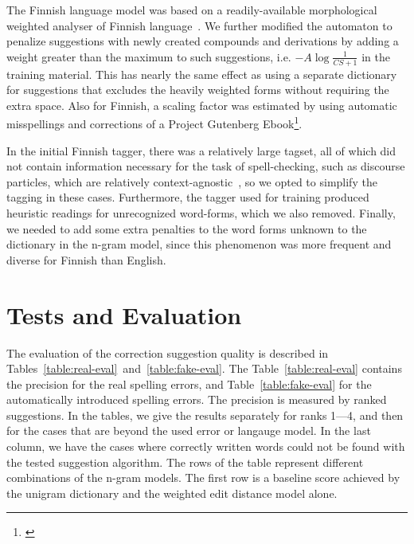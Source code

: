 \documentclass{llncs}
\begin{document}
The Finnish language model was based on a readily-available morphological
weighted analyser of Finnish language~\cite{pirinen/2011/nodalida}.  We
further modified the automaton to penalize suggestions with newly created
compounds and derivations by adding a weight greater than the maximum to such suggestions, 
i.e. $-A\log\frac{1}{CS+1}$ in the training material. This has nearly the same effect as using a separate
dictionary for suggestions that excludes the heavily weighted forms without
requiring the extra space.  Also for Finnish, a scaling factor was estimated by using automatic misspellings and corrections
of a Project Gutenberg Ebook\footnote{\url{}}.

In the initial Finnish tagger, there was a relatively large tagset, all of
which did not contain information necessary for the task of
spell-checking, such as discourse particles, which are relatively
context-agnostic~\cite{visk}, so we opted to simplify the tagging in these
cases. Furthermore, the tagger used for training produced heuristic readings for
unrecognized word-forms, which we also removed. Finally, we needed to add
some extra penalties to the word forms unknown to the dictionary in the n-gram model,
since this phenomenon was more frequent and diverse for Finnish than English.

\section{Tests and Evaluation}
\label{sec:evaluation}

The evaluation of the correction suggestion quality is described in
Tables~\ref{table:real-eval}~and~\ref{table:fake-eval}. The
Table~\ref{table:real-eval} contains the precision for the real spelling errors, 
and Table~\ref{table:fake-eval} for the automatically
introduced spelling errors. The precision is measured by ranked suggestions. In
the tables, we give the results separately for ranks 1---4, and then for the cases
that are beyond the used error or langauge model.  In the last column, we have
the cases where correctly written words could not be found with the tested 
suggestion algorithm. The  rows of the table represent different combinations of
the n-gram models. The first row is a baseline score achieved by the unigram
dictionary and the weighted edit distance model alone.
\end{document}
